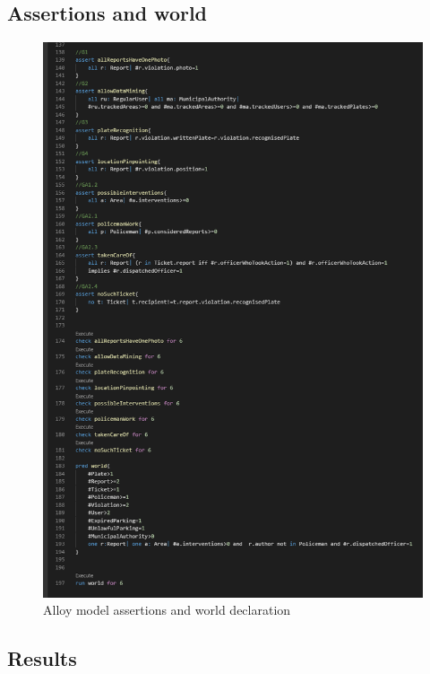 \subsection{Assertions and world}
\begin{figure}[h!]
	\centering
	\includegraphics[scale=0.70]{Images/Assertions_and_world_1-2}
	\caption{Alloy model assertions and world declaration}
\end{figure}
\newpage
\subsection{Results}
